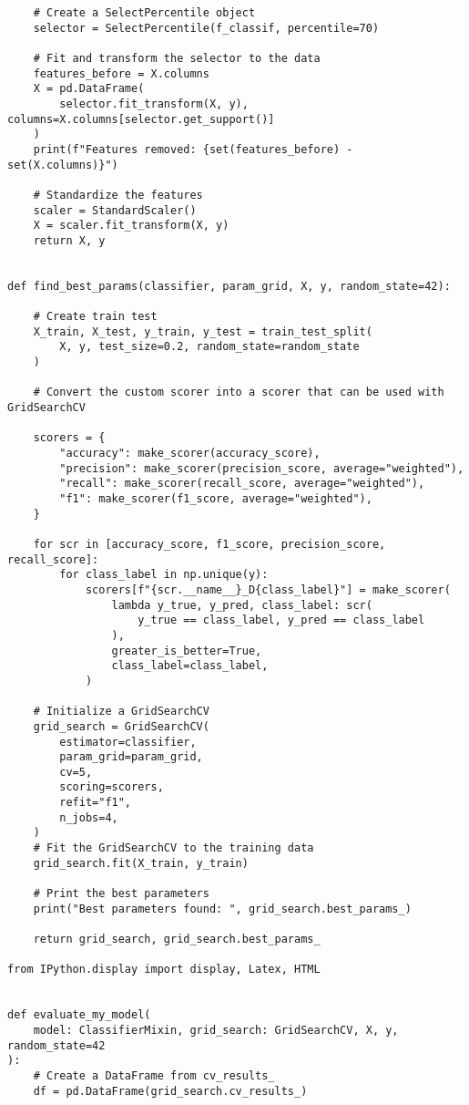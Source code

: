 \documentclass[
  english,
]{article}
\begin{document}
\begin{verbatim}
    # Create a SelectPercentile object
    selector = SelectPercentile(f_classif, percentile=70)

    # Fit and transform the selector to the data
    features_before = X.columns
    X = pd.DataFrame(
        selector.fit_transform(X, y), columns=X.columns[selector.get_support()]
    )
    print(f"Features removed: {set(features_before) - set(X.columns)}")

    # Standardize the features
    scaler = StandardScaler()
    X = scaler.fit_transform(X, y)
    return X, y


def find_best_params(classifier, param_grid, X, y, random_state=42):

    # Create train test
    X_train, X_test, y_train, y_test = train_test_split(
        X, y, test_size=0.2, random_state=random_state
    )

    # Convert the custom scorer into a scorer that can be used with GridSearchCV

    scorers = {
        "accuracy": make_scorer(accuracy_score),
        "precision": make_scorer(precision_score, average="weighted"),
        "recall": make_scorer(recall_score, average="weighted"),
        "f1": make_scorer(f1_score, average="weighted"),
    }

    for scr in [accuracy_score, f1_score, precision_score, recall_score]:
        for class_label in np.unique(y):
            scorers[f"{scr.__name__}_D{class_label}"] = make_scorer(
                lambda y_true, y_pred, class_label: scr(
                    y_true == class_label, y_pred == class_label
                ),
                greater_is_better=True,
                class_label=class_label,
            )

    # Initialize a GridSearchCV
    grid_search = GridSearchCV(
        estimator=classifier,
        param_grid=param_grid,
        cv=5,
        scoring=scorers,
        refit="f1",
        n_jobs=4,
    )
    # Fit the GridSearchCV to the training data
    grid_search.fit(X_train, y_train)

    # Print the best parameters
    print("Best parameters found: ", grid_search.best_params_)

    return grid_search, grid_search.best_params_

from IPython.display import display, Latex, HTML


def evaluate_my_model(
    model: ClassifierMixin, grid_search: GridSearchCV, X, y, random_state=42
):
    # Create a DataFrame from cv_results_
    df = pd.DataFrame(grid_search.cv_results_)


\end{verbatim}
\end{document}
